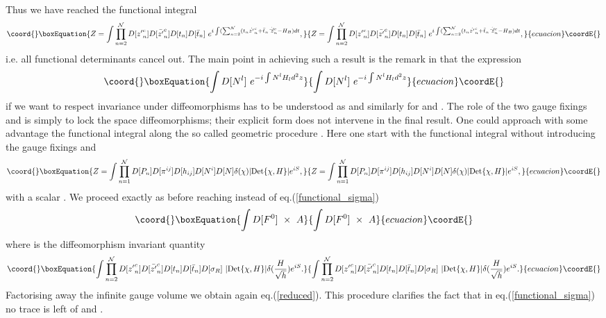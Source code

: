 \documentclass[a4paper,12pt]{article}
\begin{document}
Thus we have reached the functional integral
\begin{equation}\coord{}\boxEquation{\label{reduced}
Z=\int \prod_{n=2}^{\cal N}D[{z'}^c_n]D[\bar{ z'}^c_n]D[t_n]D[\bar
t_n]~e^{i\int (\sum_{n=2}^{\cal N}( t_n\dot {z'}^c_n +
\bar t_n \dot{\bar z'}^c_n- H_B)dt}, 
}{Z=\int \prod_{n=2}^{\cal N}D[{z'}^c_n]D[\bar{ z'}^c_n]D[t_n]D[\bar
t_n]~e^{i\int (\sum_{n=2}^{\cal N}( t_n\dot {z'}^c_n +
\bar t_n \dot{\bar z'}^c_n- H_B)dt}, 
}{ecuacion}\coordE{}\end{equation}
i.e. all functional determinants cancel out. The main point in
achieving such a result 
is the remark in \cite{carlip} that the expression
\begin{equation}\coord{}\boxEquation{
\int D[N^l]~e^{-i\int N^lH_l d^2z} 
}{
\int D[N^l]~e^{-i\int N^lH_l d^2z} 
}{ecuacion}\coordE{}\end{equation}
if we want to respect invariance under diffeomorphisms has to be
understood as
\coordHE{}
and similarly for \coordHE{} and \coordHE{}.
The role of the two gauge fixings \coordHE{} and
\coordHE{} is simply to lock the space diffeomorphisms; their
explicit form does not intervene in the final result. One could
approach with some advantage the functional integral along the so
called geometric procedure \cite{alvarez,polchinski,mottola}. Here one
start with the 
functional integral without introducing the gauge fixings \coordHE{} and
\coordHE{}
\begin{equation}\coord{}\boxEquation{
Z= \int \prod_{n=1}^{\mathcal{N}}D[P_n]
D[\pi^{ij}] D[h_{ij}] D[N^i] D[N] \delta(\chi)
|{\rm Det}\{\chi, H\}| e^{i S},
}{
Z= \int \prod_{n=1}^{\mathcal{N}}D[P_n]
D[\pi^{ij}] D[h_{ij}] D[N^i] D[N] \delta(\chi)
|{\rm Det}\{\chi, H\}| e^{i S},
}{ecuacion}\coordE{}\end{equation}
with a scalar \myHighlight{$\chi$}\coordHE{}. We proceed exactly as before reaching instead of
eq.(\ref{functional_sigma})
\begin{equation}\coord{}\boxEquation{
\int D[F^0]~\times~A
}{
\int D[F^0]~\times~A
}{ecuacion}\coordE{}\end{equation}
where \coordHE{} is the diffeomorphism invariant quantity 
\begin{equation}\coord{}\boxEquation{ 
\int \prod_{n=2}^{\cal N}D[{z'}^c_n]D[\bar{z'}^c_n]D[t_n]D[\bar
t_n] D[\sigma_R]~|{\rm Det}\{\chi, H\}| \delta(\frac{H}{\sqrt{h}}) 
e^{i S}.
}{ 
\int \prod_{n=2}^{\cal N}D[{z'}^c_n]D[\bar{z'}^c_n]D[t_n]D[\bar
t_n] D[\sigma_R]~|{\rm Det}\{\chi, H\}| \delta(\frac{H}{\sqrt{h}}) 
e^{i S}.
}{ecuacion}\coordE{}\end{equation}
Factorising away the infinite gauge volume \coordHE{} we obtain
again eq.(\ref{reduced}). This procedure clarifies the fact that in
eq.(\ref{functional_sigma}) no trace is left of \coordHE{} and
\coordHE{}.
\end{document}
